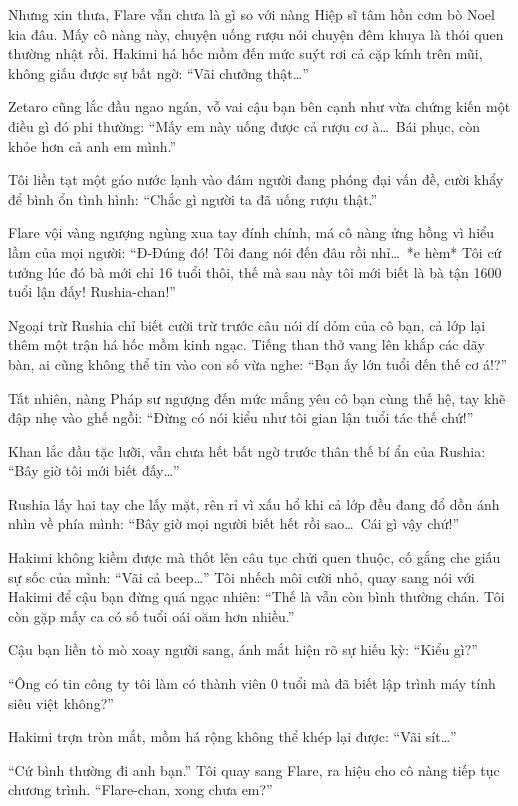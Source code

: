 \documentclass[../main.tex]{subfiles}
\begin{document}
Nhưng xin thưa, Flare vẫn chưa là gì so với nàng Hiệp sĩ tâm hồn cơm bò Noel kia đâu. Mấy cô nàng này, chuyện uống rượu nói chuyện đêm khuya là thói quen thường nhật rồi. Hakimi há hốc mồm đến mức suýt rơi cả cặp kính trên mũi, không giấu được sự bất ngờ: ``Vãi chưởng thật\dots''

Zetaro cũng lắc đầu ngao ngán, vỗ vai cậu bạn bên cạnh như vừa chứng kiến một điều gì đó phi thường: ``Mấy em này uống được cả rượu cơ à\dots\ Bái phục, còn khỏe hơn cả anh em mình.''

Tôi liền tạt một gáo nước lạnh vào đám người đang phóng đại vấn đề, cười khẩy để bình ổn tình hình: ``Chắc gì người ta đã uống rượu thật.''

Flare vội vàng ngượng ngùng xua tay đính chính, má cô nàng ửng hồng vì hiểu lầm của mọi người: ``Đ-Đúng đó! Tôi đang nói đến đâu rồi nhỉ\dots\ *e hèm* Tôi cứ tưởng lúc đó bà mới chỉ 16 tuổi thôi, thế mà sau này tôi mới biết là bà tận 1600 tuổi lận đấy! Rushia-chan!''

Ngoại trừ Rushia chỉ biết cười trừ trước câu nói dí dỏm của cô bạn, cả lớp lại thêm một trận há hốc mồm kinh ngạc. Tiếng than thở vang lên khắp các dãy bàn, ai cũng không thể tin vào con số vừa nghe: ``Bạn ấy lớn tuổi đến thế cơ á!?''

Tất nhiên, nàng Pháp sư ngượng đến mức mắng yêu cô bạn cùng thế hệ, tay khẽ đập nhẹ vào ghế ngồi: ``Đừng có nói kiểu như tôi gian lận tuổi tác thế chứ!''

Khan lắc đầu tặc lưỡi, vẫn chưa hết bất ngờ trước thân thế bí ẩn của Rushia: ``Bây giờ tôi mới biết đấy\dots''

Rushia lấy hai tay che lấy mặt, rên rỉ vì xấu hổ khi cả lớp đều đang đổ dồn ánh nhìn về phía mình: ``Bây giờ mọi người biết hết rồi sao\dots\ Cái gì vậy chứ!''

Hakimi không kiềm được mà thốt lên câu tục chửi quen thuộc, cố gắng che giấu sự sốc của mình: ``Vãi cả beep\dots'' Tôi nhếch môi cười nhỏ, quay sang nói với Hakimi để cậu bạn đừng quá ngạc nhiên: ``Thế là vẫn còn bình thường chán. Tôi còn gặp mấy ca có số tuổi oái oăm hơn nhiều.''

Cậu bạn liền tò mò xoay người sang, ánh mắt hiện rõ sự hiếu kỳ: ``Kiểu gì?''

``Ông có tin công ty tôi làm có thành viên 0 tuổi mà đã biết lập trình máy tính siêu việt không?''

Hakimi trợn tròn mắt, mồm há rộng không thể khép lại được: ``Vãi sít\dots''

``Cứ bình thường đi anh bạn.'' Tôi quay sang Flare, ra hiệu cho cô nàng tiếp tục chương trình. ``Flare-chan, xong chưa em?''
\end{document}

